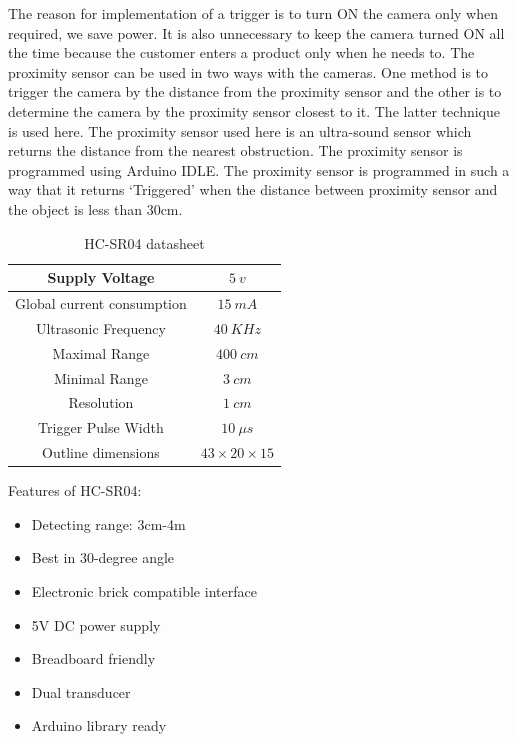 \documentclass[times, 1pt, a4paper]{article}
\begin{document}
The reason for implementation of a trigger is to turn ON the camera only when required, we save power. It is also unnecessary to keep the camera turned ON all the time because the customer enters a product only when he needs to. The proximity sensor can be used in two ways with the cameras. One method is to trigger the camera by the distance from the proximity sensor and the other is to determine the camera by the proximity sensor closest to it. The latter technique is used here. The proximity sensor used here is an ultra-sound sensor which returns the distance from the nearest obstruction. The proximity sensor is programmed using Arduino IDLE. The proximity sensor is programmed in such a way that it returns ‘Triggered’ when the distance between proximity sensor and the object is less than 30cm. 



\begin{table}[h]
\caption {HC-SR04 datasheet \label{table:hr_sr04_datasheet}} 
\centering
\begin{tabular}{|c|c|}
\hline
Supply Voltage & $5\ v$ \\ \hline
Global current consumption & $ 15\ mA $ \\ \hline
Ultrasonic Frequency & $ 40\ KHz $ \\ \hline
Maximal Range & $400\ cm$ \\ \hline
Minimal Range & $3\ cm$ \\ \hline
Resolution & $1\ cm$ \\ \hline
Trigger Pulse Width & $10\ \mu s $  \\ \hline
Outline dimensions & $ 43 \times 20 \times 15 $ \\ \hline
\end{tabular}
\end{table}	

Features of HC-SR04: 

\begin{itemize}

\item Detecting range: 3cm-4m 
\item Best in 30-degree angle
\item Electronic brick compatible interface
\item 5V DC power supply
\item Breadboard friendly
\item Dual transducer
\item Arduino library ready


\end{itemize}
\end{document}
